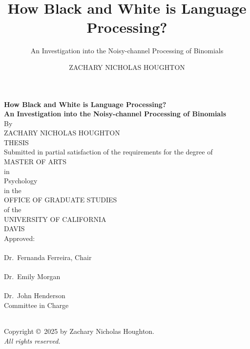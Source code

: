 \documentclass[
  12pt,
]{scrartcl}
\title{How Black and White is Language Processing?}
\subtitle{An Investigation into the Noisy-channel Processing of
Binomials}
\author{ZACHARY NICHOLAS HOUGHTON}
\date{}
\begin{document}
\cleardoublepage
\thispagestyle{plain}
\begin{center}
   \null\vfill
   \textbf{%
      How Black and White is Language Processing?\\
	  An Investigation into the Noisy-channel Processing of Binomials
   }%
   \\
   \bigskip
   By \\
   \bigskip
   {ZACHARY NICHOLAS HOUGHTON}
\\   
   THESIS \\
   \bigskip
   Submitted in partial satisfaction of the requirements for the
   degree of \\
   \bigskip
   MASTER OF ARTS \\
   \bigskip
   in \\
   \bigskip
   {Psychology} \\ 
      \bigskip
   in the \\
   \bigskip
   OFFICE OF GRADUATE STUDIES \\
   \bigskip        
   of the \\
   \bigskip
   UNIVERSITY OF CALIFORNIA \\
   \bigskip
   DAVIS \\
   \bigskip
   Approved: \\
   \bigskip
   \bigskip
   \makebox[3in]{\hrulefill} \\
   Dr.~Fernanda Ferreira, Chair \\
   \bigskip
   \bigskip
   \makebox[3in]{\hrulefill} \\
   Dr.~Emily Morgan \\
   \bigskip
   \bigskip
   \makebox[3in]{\hrulefill} \\
   Dr.~John Henderson \\
   \bigskip
   Committee in Charge \\
    \\
   \vfill
\end{center}


\newpage
{}
\setcounter{savedpage}{\value{page}}

\thispagestyle{empty}
\begin{titlepage}
\begin{center}
  Copyright \copyright\ 2025 by Zachary Nicholas Houghton. \\
  \textit{All rights reserved.}
\end{center}
\end{titlepage}
\end{document}

